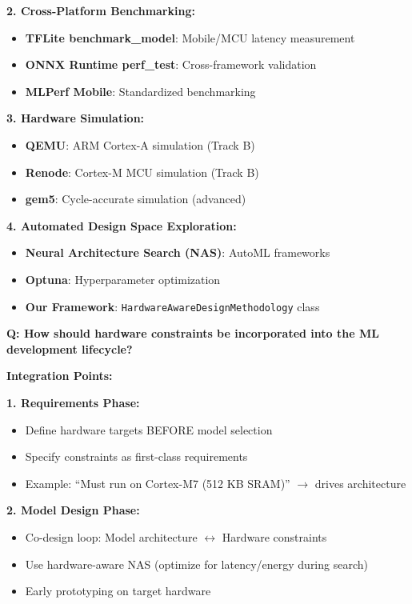 \documentclass[10pt, a4paper]{article}
\begin{document}
\textbf{2. Cross-Platform Benchmarking:}
\begin{itemize}
    \item \textbf{TFLite benchmark\_model}: Mobile/MCU latency measurement
    \item \textbf{ONNX Runtime perf\_test}: Cross-framework validation
    \item \textbf{MLPerf Mobile}: Standardized benchmarking
\end{itemize}

\textbf{3. Hardware Simulation:}
\begin{itemize}
    \item \textbf{QEMU}: ARM Cortex-A simulation (Track B)
    \item \textbf{Renode}: Cortex-M MCU simulation (Track B)
    \item \textbf{gem5}: Cycle-accurate simulation (advanced)
\end{itemize}

\textbf{4. Automated Design Space Exploration:}
\begin{itemize}
    \item \textbf{Neural Architecture Search (NAS)}: AutoML frameworks
    \item \textbf{Optuna}: Hyperparameter optimization
    \item \textbf{Our Framework}: \texttt{HardwareAwareDesignMethodology} class
\end{itemize}

\textbf{Q: How should hardware constraints be incorporated into the ML development lifecycle?}

\textbf{Integration Points:}

\textbf{1. Requirements Phase:}
\begin{itemize}
    \item Define hardware targets BEFORE model selection
    \item Specify constraints as first-class requirements
    \item Example: ``Must run on Cortex-M7 (512 KB SRAM)'' $\rightarrow$ drives architecture
\end{itemize}

\textbf{2. Model Design Phase:}
\begin{itemize}
    \item Co-design loop: Model architecture $\leftrightarrow$ Hardware constraints
    \item Use hardware-aware NAS (optimize for latency/energy during search)
    \item Early prototyping on target hardware
\end{itemize}
\end{document}
